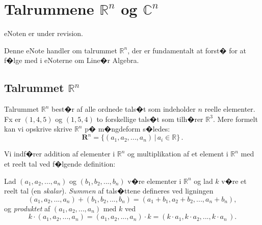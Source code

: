 
\setcounter{chapter}{0} %

\chapter{Talrummene $\mathbb R^n $ og $\mathbb C^n $} \label{tn1}

eNoten er under revision.

 

\begin{basis}
Denne eNote handler om talrummet $\mathbb R^n $, der er fundamentalt at forst� for at f�lge med i eNoterne om Line�r Algebra.
\end{basis}

\section{Talrummet $\mathbb R^n $}

Talrummet $\mathbb R ^n$ best�r af alle ordnede tals�t som indeholder $n$ reelle elementer. Fx er $(1,4,5)$ og $(1,5,4)$ to forskellige tals�t som tilh�rer $\mathbb R ^3$. Mere formelt kan vi opskrive skrive $\mathbb R ^n$ p� m�ngdeform s�ledes:
\begin{equation}\label{eqRn}
\mathbf R ^n=\{(a_1,a_2,...,a_n)\,|\,a_i \in \mathbb R\}\,.
\end{equation}

Vi indf�rer addition af elementer i $\mathbb R ^n$ og multiplikation af et element i $\mathbb R ^n$ med et reelt tal ved f�lgende definition:

\begin{definition}\label{tn1.defRegneOP}
Lad $(a_1,a_2,...,a_n)$ og $(b_1,b_2,...,b_n)$ v�re elementer i $\mathbb R ^n$ og lad $k$ v�re et reelt tal (en \emph{skalar}).
\textit{Summen} af tals�ttene defineres ved ligningen
\begin{equation}\label{eqRnSum}
(a_1,a_2,...,a_n)+(b_1,b_2,...,b_n)=(a_1+b_1,a_2+b_2,...,a_n+b_n),
\end{equation}
og \textit{produktet} af $(a_1,a_2,...,a_n)$ med $k$ ved
\begin{equation}\label{eqRnMult}
k\cdot(a_1,a_2,...,a_n)=(a_1,a_2,...,a_n)\cdot k=(k\cdot a_1,k\cdot a_2,...,k\cdot a_n\,).
\end{equation}
\end{definition}

